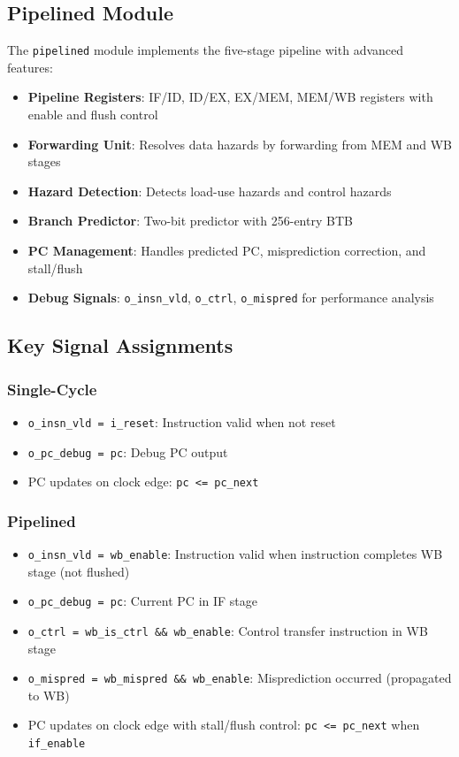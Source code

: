 \subsection{Pipelined Module}

The \texttt{pipelined} module implements the five-stage pipeline with advanced features:

\begin{itemize}
    \item \textbf{Pipeline Registers}: IF/ID, ID/EX, EX/MEM, MEM/WB registers with enable and flush control
    \item \textbf{Forwarding Unit}: Resolves data hazards by forwarding from MEM and WB stages
    \item \textbf{Hazard Detection}: Detects load-use hazards and control hazards
    \item \textbf{Branch Predictor}: Two-bit predictor with 256-entry BTB
    \item \textbf{PC Management}: Handles predicted PC, misprediction correction, and stall/flush
    \item \textbf{Debug Signals}: \texttt{o\_insn\_vld}, \texttt{o\_ctrl}, \texttt{o\_mispred} for performance analysis
\end{itemize}

\subsection{Key Signal Assignments}

\subsubsection{Single-Cycle}
\begin{itemize}
    \item \texttt{o\_insn\_vld = i\_reset}: Instruction valid when not reset
    \item \texttt{o\_pc\_debug = pc}: Debug PC output
    \item PC updates on clock edge: \texttt{pc <= pc\_next}
\end{itemize}

\subsubsection{Pipelined}
\begin{itemize}
    \item \texttt{o\_insn\_vld = wb\_enable}: Instruction valid when instruction completes WB stage (not flushed)
    \item \texttt{o\_pc\_debug = pc}: Current PC in IF stage
    \item \texttt{o\_ctrl = wb\_is\_ctrl \&\& wb\_enable}: Control transfer instruction in WB stage
    \item \texttt{o\_mispred = wb\_mispred \&\& wb\_enable}: Misprediction occurred (propagated to WB)
    \item PC updates on clock edge with stall/flush control: \texttt{pc <= pc\_next} when \texttt{if\_enable}
\end{itemize}

